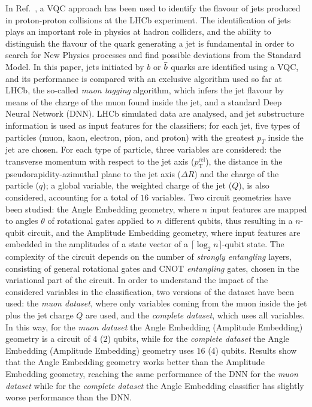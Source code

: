 In Ref.~\cite{Gianelle:2022unu}, a VQC approach has been used to identify the flavour of jets produced in proton-proton collisions at the LHCb experiment.
The identification of jets plays an important role in physics at hadron colliders, and the ability to distinguish the flavour of the quark generating a jet is fundamental in order to search for New Physics processes and find possible deviations from the Standard Model.
In this paper, jets initiated by $b$ or $\Bar{b}$ quarks are identified using a VQC, and its performance is compared with an exclusive algorithm used so far at LHCb, the so-called \emph{muon tagging} algorithm, which infers the jet flavour by means of the charge of the muon found inside the jet, and a standard Deep Neural Network (DNN).
LHCb simulated data are analysed, and jet substructure information is used as input features for the classifiers; for each jet, five types of particles (muon, kaon, electron, pion, and proton) with the greatest $p_T$ inside the jet are chosen.
For each type of particle, three variables are considered: the transverse momentum with respect to the jet axis ($p_{\mathrm{T}}^{\mathrm{rel}}$), the distance in the pseudorapidity-azimuthal plane to the jet axis ($\Delta R$) and the charge of the particle ($q$); a global variable, the weighted charge of the jet ($Q$), is also considered, accounting for a total of $16$ variables.
Two circuit geometries have been studied: the Angle Embedding geometry, where $n$ input features are mapped to angles $\theta$ of rotational gates applied to $n$ different qubits, thus resulting in a $n$-qubit circuit, and the Amplitude Embedding geometry, where input features are embedded in the amplitudes of a state vector of a $\lceil\log_2{n}\rceil$-qubit state.
The complexity of the circuit depends on the number of \emph{strongly entangling} layers, consisting of general rotational gates and CNOT \emph{entangling} gates, chosen in the variational part of the circuit.
In order to understand the impact of the considered variables in the classification, two versions of the dataset have been used: the \emph{muon dataset}, where only variables coming from the muon inside the jet plus the jet charge $Q$ are used, and the \emph{complete dataset}, which uses all variables.
In this way, for the \emph{muon dataset} the Angle Embedding (Amplitude Embedding) geometry is a circuit of $4$ ($2$) qubits, while for the \emph{complete dataset} the Angle Embedding (Amplitude Embedding) geometry uses $16$ ($4$) qubits.
Results show that the Angle Embedding geometry works better than the Amplitude Embedding geometry, reaching the same performance of the DNN for the \emph{muon dataset} while for the \emph{complete dataset} the Angle Embedding classifier has slightly worse performance than the DNN.
